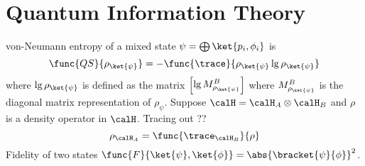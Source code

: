 \chapter{Quantum Information Theory}
von-Neumann entropy of a mixed state \(\psi = \bigoplus \ket{p_i,\phi_i}\) is 
\begin{equation*}
    \func{QS}{\rho_{\ket{\psi}}} = - \func{\trace}{\rho_{\ket{\psi}} \lg \rho_{\ket{\psi}}}
\end{equation*}
where \(\lg \rho_{\ket{\psi}}\) is defined as the matrix \(\begin{bmatrix}
    \lg M^B_{\rho_{\ket{\psi}}}
\end{bmatrix}\)
where \(M^B_{\rho_{\ket{\psi}}}\) is the diagonal matrix representation of \(\rho_{\psi}\).
Suppose \(\calH = \calH_A \otimes \calH_B\) and \(\rho\) is a density operator in \(\calH\). Tracing out ??
\begin{equation*}
    \rho_{\calH_A} = \func{\trace_{\calH_B}}{\rho}
\end{equation*}
Fidelity of two states \(\func{F}{\ket{\psi}, \ket{\phi}} = \abs{\bracket{\psi}{\phi}}^2\).